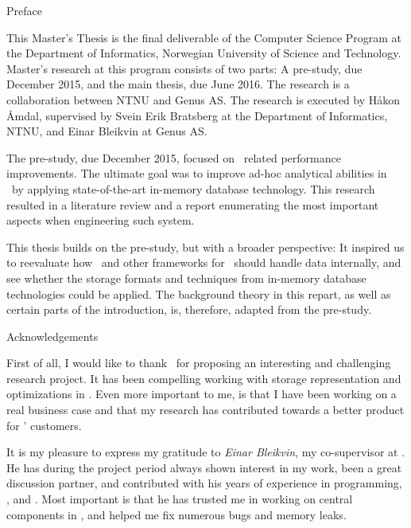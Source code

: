 {\Huge Preface}
\vspace{1cm}

This Master's Thesis is the final deliverable of the Computer Science Program at the Department of Informatics, Norwegian University of Science and Technology. Master's research at this program consists of two parts: A pre-study, due December 2015, and the main thesis, due June 2016. The research is a collaboration between NTNU and Genus AS. The research is executed by Håkon Åmdal, supervised by Svein Erik Bratsberg at the Department of Informatics, NTNU, and Einar Bleikvin at Genus AS.

The pre-study, due December 2015, focused on \bi~related performance improvements. The ultimate goal was to improve ad-hoc analytical abilities in \gap~by applying state-of-the-art in-memory database technology. This research resulted in a literature review and a report enumerating the most important aspects when engineering such system.

This thesis builds on the pre-study, but with a broader perspective: It inspired us to reevaluate how \gap~and other frameworks for \mde~should handle data internally, and see whether the storage formats and techniques from in-memory database technologies could be applied. The background theory in this repart, as well as certain parts of the introduction, is, therefore, adapted from the pre-study.

\vspace{1cm}

{\Large Acknowledgements}


First of all, I would like to thank \genus~for proposing an interesting and challenging research project. It has been compelling working with storage representation and optimizations in \gap. Even more important to me, is that I have been working on a real business case and that my research has contributed towards a better product for \genus' customers.

It is my pleasure to express my gratitude to \textit{Einar Bleikvin}, my co-supervisor at \genus. He has during the project period always shown interest in my work, been a great discussion partner, and contributed with his years of experience in programming, \delphi, and \gap. Most important is that he has trusted me in working on central components in \gap, and helped me fix numerous bugs and memory leaks.

